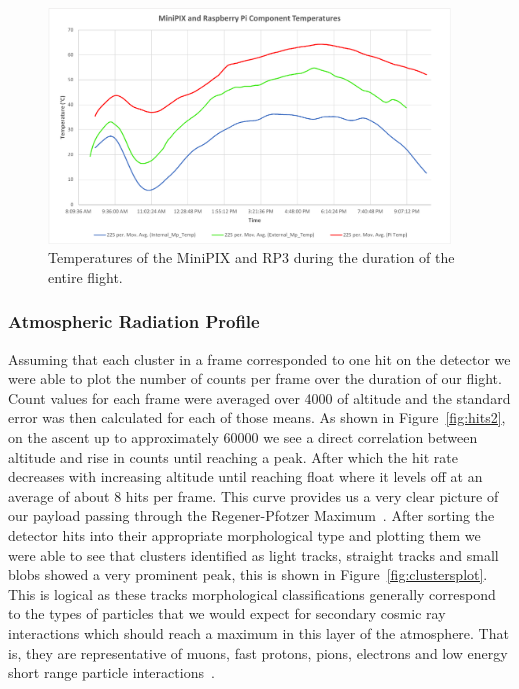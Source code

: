 \begin{figure}[h!]
\begin{center}
\includegraphics[width=0.95\textwidth]{./Figures/mp_pi_temps.pdf}
\caption{Temperatures of the MiniPIX and RP3 during the duration of the entire flight.}
\label{fig:mp_pi_temps}
\end{center}
\end{figure}
        
\subsubsection{Atmospheric Radiation Profile}

Assuming that each cluster in a frame corresponded to one hit on the detector we were able to plot the number of counts per frame over the duration of our flight. Count values for each frame were averaged over \SI{4000}{\feet} of altitude and the standard error was then calculated for each of those means. As shown in Figure~\ref{fig:hits2}, on the ascent up to approximately \SI{60000}{\feet} we see a direct correlation between altitude and rise in counts until reaching a peak. After which the hit rate decreases with increasing altitude until reaching float where it levels off at an average of about 8 hits per frame. This curve provides us a very clear picture of our payload passing through the Regener-Pfotzer Maximum~\cite{regener}. After sorting the detector hits into their appropriate morphological type and plotting them we were able to see that clusters identified as light tracks, straight tracks and small blobs showed a very prominent peak, this is shown in Figure~\ref{fig:clustersplot}. This is logical as these tracks morphological classifications generally correspond to the types of particles that we would expect for secondary cosmic ray interactions which should reach a maximum in this layer of the atmosphere. That is, they are representative of muons, fast protons, pions, electrons and low energy short range particle interactions~\cite{stuartthesis}.


